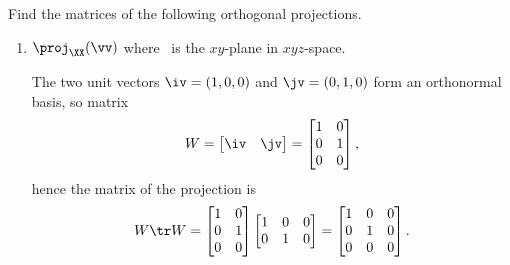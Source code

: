\begin{example} 
Find the matrices of the following orthogonal projections.
\begin{enumerate}
\item \(\proj_\XX(\vv)\) where \XX\ is the \(xy\)-plane in \(xyz\)-space.
\begin{solution} 
The two unit vectors \(\iv=(1,0,0)\) and \(\jv=(0,1,0)\) form an orthonormal basis, so matrix
\begin{equation*}
W=\begin{bmatrix} \iv&\jv \end{bmatrix}
=\begin{bmatrix} 1&0\\0&1\\0&0 \end{bmatrix},
\end{equation*}
hence the matrix of the projection is
\begin{equation*}
W\tr W=\begin{bmatrix} 1&0\\0&1\\0&0 \end{bmatrix}
\begin{bmatrix} 1&0&0\\0&1&0 \end{bmatrix}
=\begin{bmatrix} 1&0&0\\0&1&0\\0&0&0 \end{bmatrix}.
\end{equation*}
\end{solution}


\end{enumerate}
\end{example}
